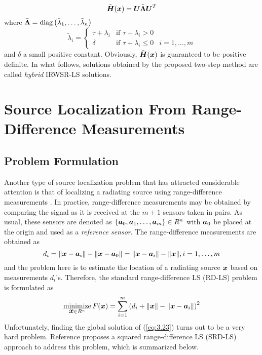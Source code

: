 \begin{equation}
\nonumber
\tilde{\mbox{\boldmath$H$}}(\mbox{\boldmath$x$})=\mbox{\boldmath$U$}\tilde{\mbox{\boldmath{$\Lambda$}}}\mbox{\boldmath$U$}^T
\end{equation}
where $\tilde{\mbox{\boldmath{$\Lambda$}}}=\mbox{diag}\left(\tilde{\lambda}_1,\ldots, \tilde{\lambda}_n\right)$
\begin{equation}
\nonumber
\tilde{\lambda}_i=\left\{\begin{array} {lll}
    \tau+\lambda_i & \mbox{if } \tau+\lambda_i>0 & \\
    \delta &  \mbox{if } \tau+\lambda_i\leq0 & i=1,\ldots,m \end{array} \right.
\end{equation}
and $\delta$ a small positive constant. Obviously, $\tilde{\mbox{\boldmath$H$}}(\mbox{\boldmath$x$})$ is guaranteed to be positive definite. In what follows, solutions obtained by the proposed two-step method are called \textit{hybrid} IRWSR-LS solutions.


\section{Source Localization From Range-Difference Measurements}%
\subsection{Problem Formulation} %

Another type of source localization problem that has attracted considerable attention is that of localizing a radiating source using range-difference measurements \cite{ StLi, BeckStLi}. In practice, range-difference measurements may be
obtained by comparing the signal as it is received at the $m+1$ sensors taken in pairs. As usual, these sensors are denoted as $\{\mbox{\boldmath$a$}_0, \mbox{\boldmath$a$}_1,\ldots,\mbox{\boldmath$a$}_m\} \in R^n$ with $\mbox{\boldmath$a$}_0$ be placed at the origin and used as a \textit{reference sensor}.  The range-difference measurements are obtained as
 \begin{equation} \label{eq:3.22}
 d_i=\|\mbox{\boldmath$x$}-\mbox{\boldmath$a$}_i\|-\|\mbox{\boldmath$x$}-\mbox{\boldmath$a$}_0\|=\|\mbox{\boldmath$x$}-\mbox{\boldmath$a$}_i\|-\|\mbox{\boldmath$x$}\|, i = 1,\ldots,m
 \end{equation}
and the problem here is to estimate the location of a radiating source $\mbox{\boldmath$x$}$ based on measurements $d_i$'s. Therefore, the standard range-difference LS (RD-LS) problem is formulated as
 \begin{equation} \label{eq:3.23}
\mathop{\mbox{minimize}}_{\mbox{\boldmath$x$} \in R^n} F(\mbox{\boldmath$x$})=\sum_{i=1}^m \left(d_i+\|\mbox{\boldmath$x$}\|-\|\mbox{\boldmath$x$}-\mbox{\boldmath$a$}_i\|\right)^2
 \end{equation}
 Unfortunately, finding the global solution of (\ref{eq:3.23}) turns out to be a very hard problem. Reference \cite{BeckStLi} proposes a squared range-difference LS (SRD-LS) approach to address this problem, which is summarized below.

